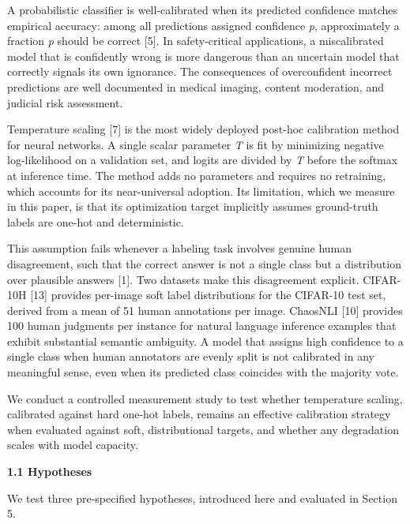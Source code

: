 \documentclass[11pt]{article}
\begin{document}
A probabilistic classifier is well-calibrated when its predicted
confidence matches empirical accuracy: among all predictions assigned
confidence \emph{p}, approximately a fraction \emph{p} should be correct
{[}5{]}. In safety-critical applications, a miscalibrated model that is
confidently wrong is more dangerous than an uncertain model that
correctly signals its own ignorance. The consequences of overconfident
incorrect predictions are well documented in medical imaging, content
moderation, and judicial risk assessment.

Temperature scaling {[}7{]} is the most widely deployed post-hoc
calibration method for neural networks. A single scalar parameter
\emph{T} is fit by minimizing negative log-likelihood on a validation
set, and logits are divided by \emph{T} before the softmax at inference
time. The method adds no parameters and requires no retraining, which
accounts for its near-universal adoption. Its limitation, which we
measure in this paper, is that its optimization target implicitly
assumes ground-truth labels are one-hot and deterministic.

This assumption fails whenever a labeling task involves genuine human
disagreement, such that the correct answer is not a single class but a
distribution over plausible answers {[}1{]}. Two datasets make this
disagreement explicit. CIFAR-10H {[}13{]} provides per-image soft label
distributions for the CIFAR-10 test set, derived from a mean of 51 human
annotations per image. ChaosNLI {[}10{]} provides 100 human judgments
per instance for natural language inference examples that exhibit
substantial semantic ambiguity. A model that assigns high confidence to
a single class when human annotators are evenly split is not calibrated
in any meaningful sense, even when its predicted class coincides with
the majority vote.

We conduct a controlled measurement study to test whether temperature
scaling, calibrated against hard one-hot labels, remains an effective
calibration strategy when evaluated against soft, distributional
targets, and whether any degradation scales with model capacity.

\textbf{1.1 Hypotheses}

We test three pre-specified hypotheses, introduced here and evaluated in
Section 5.
\end{document}

